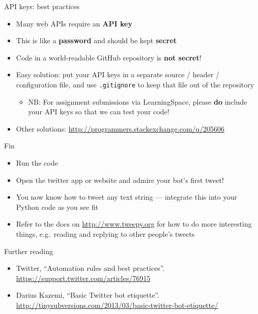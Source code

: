\begin{frame}{API keys: best practices}
    \begin{itemize}
        \item Many web APIs require an \textbf{API key}
        \item This is like a \textbf{password} and should be kept \textbf{secret}
        \item Code in a world-readable GitHub repository is \textbf{not secret}!
        \item Easy solution: put your API keys in a separate source / header / configuration file,
            and use \texttt{.gitignore} to keep that file out of the repository
                \begin{itemize}
                    \item NB: For assignment submissions via LearningSpace,
                        please \textbf{do} include your API keys so that we can test your code!
                \end{itemize}
        \item Other solutions:
            \url{http://programmers.stackexchange.com/q/205606}
    \end{itemize}
\end{frame}

\begin{frame}{Fin}
    \begin{itemize}
        \item Run the code
        \item Open the twitter app or website and admire your bot's first tweet!
        \item You now know how to tweet any text string --- integrate this into your Python code as you see fit
        \item Refer to the docs on \url{http://www.tweepy.org}
            for how to do more interesting things, e.g.\ reading and replying to other people's tweets
    \end{itemize}
\end{frame}

\begin{frame}{Further reading}
    \begin{itemize}
        \item Twitter, ``Automation rules and best practices''.
            \url{https://support.twitter.com/articles/76915}
        \item Darius Kazemi, ``Basic Twitter bot etiquette''.
            \url{http://tinysubversions.com/2013/03/basic-twitter-bot-etiquette/}
    \end{itemize}
\end{frame}


